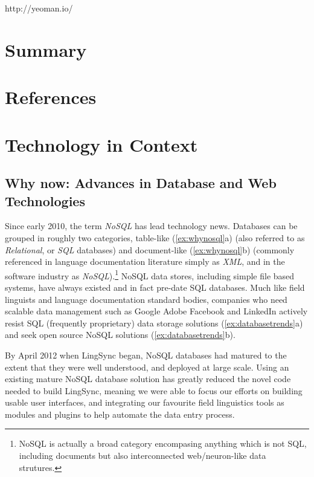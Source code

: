 \documentclass[12pt]{article}
\begin{document}
http://yeoman.io/

\section{Summary}
\section*{References}

%


\appendix
\section{Technology in Context}

\subsection{Why now: Advances in Database and Web Technologies}
\label{appendix:technology}

Since early 2010, the term \emph{NoSQL} has lead technology news. Databases can be grouped in roughly two categories, table-like (\ref{ex:whynosql}a) (also referred to as \emph{Relational}, or \emph{SQL} databases) and document-like (\ref{ex:whynosql}b) (commonly referenced in language documentation literature  simply as \emph{XML}, and in the software industry as \emph{NoSQL}).\footnote{NoSQL is actually a broad category encompasing anything which is not SQL, including documents but also interconnected web/neuron-like data strutures.} NoSQL data stores, including simple file based systems, have always existed and in fact pre-date SQL databases. Much like field linguists and language documentation standard bodies, companies who need  scalable data management such as Google \citep{Dean:2004, Dean:2008}  Adobe \citep{Lehene:2010:Online} Facebook \citep{Borthakur:2011}  and LinkedIn \citep{Sumbaly:2013} actively resist SQL (frequently proprietary) data storage solutions  (\ref{ex:databasetrends}a) and seek open source NoSQL solutions (\ref{ex:databasetrends}b). 

By April 2012 when LingSync began, NoSQL databases had matured to the extent that they were well understood, and deployed at large scale. 
Using an existing mature NoSQL database solution has greatly reduced the novel code needed to build LingSync, meaning we were able to focus our efforts on building usable user interfaces, and integrating our favourite field linguistics tools as modules and plugins to help automate the data entry process. 
\end{document}
